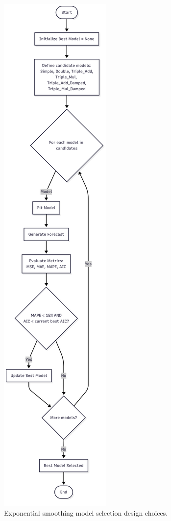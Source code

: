 \begin{figure}[h]
	\centering
	\includegraphics[scale=0.18]{"Chapters/images/exponentialsmoothingmodel.png"}
	\caption{Exponential smoothing model selection design choices.}
	\label{fig:exponential-smoothing-model-choice}
\end{figure}
